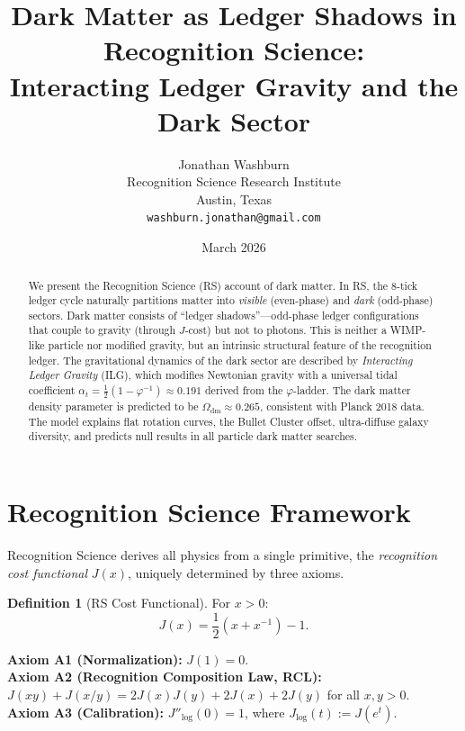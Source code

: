 \documentclass[12pt,a4paper]{article}
\title{Dark Matter as Ledger Shadows in Recognition
Science:\\Interacting Ledger Gravity and the Dark Sector}
\author{Jonathan Washburn\\
Recognition Science Research Institute\\
Austin, Texas\\
\texttt{washburn.jonathan@gmail.com}}
\date{March 2026}
\theoremstyle{definition}
\newtheorem{definition}[theorem]{Definition}
\theoremstyle{remark}
\begin{document}
\maketitle

\begin{abstract}
We present the Recognition Science (RS) account of dark
matter.  In RS, the 8-tick ledger cycle naturally partitions
matter into \emph{visible} (even-phase) and \emph{dark}
(odd-phase) sectors.  Dark matter consists of ``ledger
shadows''---odd-phase ledger configurations that couple to
gravity (through $J$-cost) but not to photons.  This is
neither a WIMP-like particle nor modified gravity, but an
intrinsic structural feature of the recognition ledger.
The gravitational dynamics of the dark sector are described
by \emph{Interacting Ledger Gravity} (ILG), which modifies
Newtonian gravity with a universal tidal coefficient
$\alpha_t = \tfrac{1}{2}(1 - \varphi^{-1}) \approx 0.191$
derived from the $\varphi$-ladder.  The dark matter density
parameter is predicted to be
$\Omega_{\mathrm{dm}} \approx 0.265$, consistent with
Planck 2018 data.  The model explains flat rotation curves,
the Bullet Cluster offset, ultra-diffuse galaxy diversity,
and predicts null results in all particle dark matter
searches.
\end{abstract}

\section{Recognition Science Framework}
\label{sec:framework}

Recognition Science derives all physics from a single primitive,
the \emph{recognition cost functional} $J(x)$, uniquely determined
by three axioms.

\begin{definition}[RS Cost Functional]
For $x > 0$:
\begin{equation}
  J(x) = \frac{1}{2}\!\left(x + x^{-1}\right) - 1.
\end{equation}
\end{definition}

\noindent\textbf{Axiom A1 (Normalization):} $J(1) = 0$.\\
\textbf{Axiom A2 (Recognition Composition Law, RCL):}
$J(xy) + J(x/y) = 2J(x)J(y) + 2J(x) + 2J(y)$ for all $x, y > 0$.\\
\textbf{Axiom A3 (Calibration):} $J''_{\log}(0) = 1$, where
$J_{\log}(t) := J(e^t)$.
\end{document}
